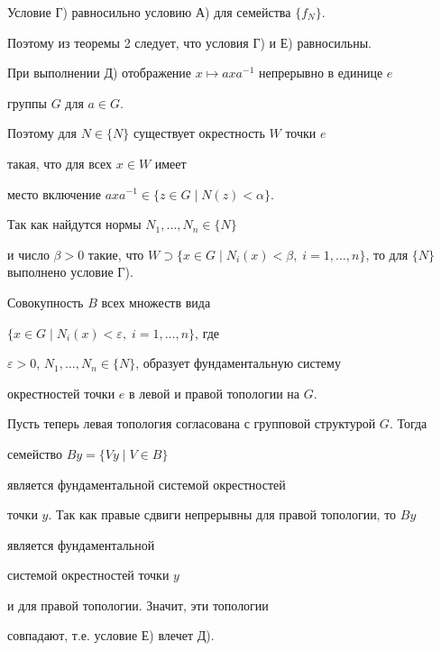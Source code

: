  


\begin{pf} Условие Г) равносильно условию А) для семейства $\{f_N\}$. 


Поэтому из теоремы 2 следует, что условия Г) и Е) равносильны. 


 


При выполнении Д) отображение $x\mapsto axa^{-1}$ непрерывно в единице $e$ 


группы $G$ для $a\in G$. 


Поэтому для $N\in\{N\}$ существует окрестность $W$ точки $e$ 


такая, что для всех $x\in W$ имеет 


место включение $axa^{-1}\in\{z\in G\mid N(z)<\alpha\}$. 


Так как найдутся нормы $N_1,\dotsc,N_n\in\{N\}$ 


и число $\beta>0$ такие, что $W\supset\{x\in G\mid 


N_i(x)<\beta,\;i=1,\dotsc,n\}$, то для $\{N\}$ выполнено условие Г). 


 


Совокупность $B$ всех множеств вида 


$\{x\in G\mid N_i(x)<\varepsilon,\;i=1,\dotsc,n\}$, где 


$\varepsilon>0$, $N_1,\dotsc,N_n\in\{N\}$, образует фундаментальную систему 


окрестностей точки $e$ в левой и правой топологии на $G$. 


 


Пусть теперь левая топология согласована с групповой структурой $G$. Тогда 


семейство $By=\{Vy\mid V\in B\}$ 


является фундаментальной системой окрестностей 


точки $y$. Так как правые сдвиги непрерывны для правой топологии, то $By$ 


является фундаментальной 


системой окрестностей точки $y$ 


и для правой топологии. Значит, эти топологии 


совпадают, т.е. условие Е) влечет Д).


\end{pf} 


 


